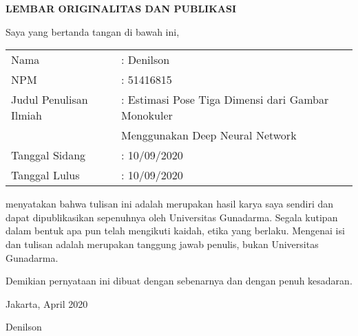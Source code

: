 
\newpage
{}
\begin{center}
    {\large \bf \centering LEMBAR ORIGINALITAS DAN PUBLIKASI}
    \vspace{0.75cm}
\end{center}

\noindent Saya yang bertanda tangan di bawah ini,
\vspace{0.5cm}

\begin{flushleft}
    \begin{tabular}{ll}
        Nama                   & : Denilson                                         \\
        NPM                    & : 51416815                                         \\
        Judul Penulisan Ilmiah & : Estimasi Pose Tiga Dimensi dari Gambar Monokuler \\
                               & \hspace{5pt} Menggunakan Deep Neural Network       \\
        Tanggal Sidang         & : 10/09/2020                                       \\
        Tanggal Lulus          & : 10/09/2020                                       \\
    \end{tabular}
\end{flushleft}

\vspace{0.5cm}

\noindent menyatakan bahwa tulisan ini adalah merupakan hasil karya saya sendiri dan dapat
dipublikasikan sepenuhnya oleh Universitas Gunadarma. Segala kutipan dalam bentuk apa pun telah
mengikuti kaidah, etika yang berlaku. Mengenai isi dan tulisan adalah merupakan tanggung jawab
penulis, bukan Universitas Gunadarma.

\vspace{0.5cm}

\noindent Demikian pernyataan ini dibuat dengan sebenarnya dan dengan penuh kesadaran.

\begin{flushright}
    Jakarta, April 2020

    \vspace{2cm}

    Denilson
\end{flushright}
